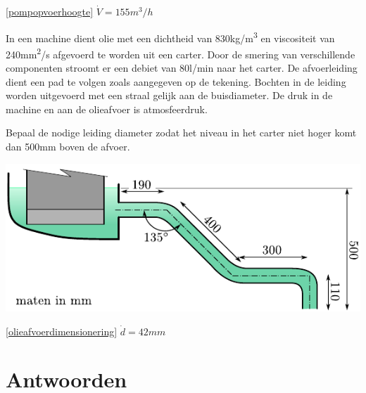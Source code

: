 \begin{antwoord}{\ref{pompopvoerhoogte}}
	$\dot{V} = 155\unit{m^3/h}$
\end{antwoord}
\begin{toepassing}[*]
	\label{olieafvoerdimensionering}
In een machine dient olie met een dichtheid van 830\unit{kg/m^3} en viscositeit van 240\unit{mm^2/s} afgevoerd te worden uit een carter. Door de smering van verschillende componenten stroomt er een debiet van 80l/min naar het carter. De afvoerleiding dient een pad te volgen zoals aangegeven op de tekening. Bochten in de leiding worden uitgevoerd met een straal gelijk aan de buisdiameter. De druk in de machine en aan de olieafvoer is atmosfeerdruk.
	
Bepaal de nodige leiding diameter zodat het niveau in het carter niet hoger komt dan 500mm boven de afvoer.

	\centering
	\includegraphics{fig/stroming_in_leidingen/olieafvoerdimensionering}
\end{toepassing}
\begin{antwoord}{\ref{olieafvoerdimensionering}}
	$\dot{d} = 42\unit{mm}$
\end{antwoord}
\section*{Antwoorden}
	\begin{multicols}{2}
	\end{multicols}